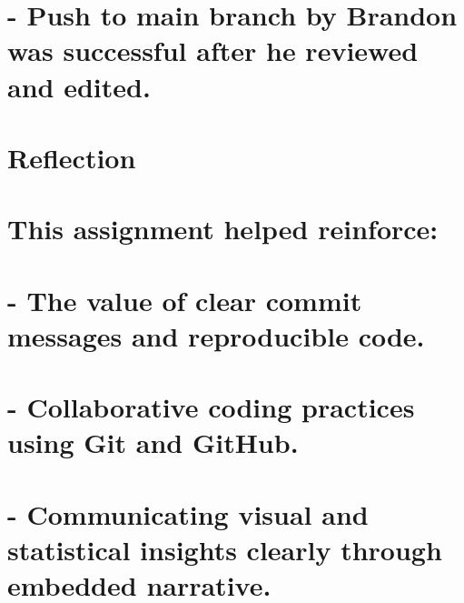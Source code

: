 \documentclass[
]{article}
\begin{document}
\section{- Push to main branch by Brandon was successful after he
reviewed and
edited.}\label{push-to-main-branch-by-brandon-was-successful-after-he-reviewed-and-edited.}

\section{Reflection}\label{reflection}

\section{This assignment helped
reinforce:}\label{this-assignment-helped-reinforce}

\section{- The value of clear commit messages and reproducible
code.}\label{the-value-of-clear-commit-messages-and-reproducible-code.}

\section{- Collaborative coding practices using Git and
GitHub.}\label{collaborative-coding-practices-using-git-and-github.}

\section{- Communicating visual and statistical insights clearly through
embedded
narrative.}\label{communicating-visual-and-statistical-insights-clearly-through-embedded-narrative.}
\end{document}
